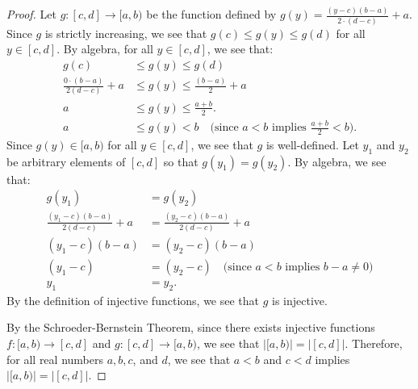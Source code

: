 \documentclass{amsart}
\newcommand{\abs}[1]{\left|#1\right|}
\numberwithin{equation}{section}
\begin{document}
\begin{problem}[manual-num=66]
\begin{proof}
			Let $g : [c, d] \rightarrow [a, b)$ be the function defined by $g(y) = \frac{(y - c)(b - a)}{2 \cdot (d - c)} + a$.
			Since $g$ is strictly increasing, we see that $g(c) \leq g(y) \leq g(d)$ for all $y \in [c, d]$.
			By algebra, for all $y \in [c, d]$, we see that:
			\begin{align*}
				g(c) &\leq g(y) \leq g(d) \\
				\frac{0 \cdot (b - a)}{2(d - c)} + a &\leq g(y) \leq \frac{(b - a)}{2} + a \\
				a &\leq g(y) \leq \frac{a + b}{2}. \\
				a &\leq g(y) < b \quad \text{(since $a < b$ implies $\frac{a + b}{2} < b$)}.
			\end{align*}
			Since $g(y) \in [a, b)$ for all $y \in [c, d]$, we see that $g$ is well-defined.
			Let $y_1$ and $y_2$ be arbitrary elements of $[c, d]$ so that $g(y_1) = g(y_2)$.
			By algebra, we see that:
			\begin{align*}
				g(y_1) &= g(y_2) \\
				\frac{(y_1 - c)(b - a)}{2(d - c)} + a &= \frac{(y_2 - c)(b - a)}{2(d - c)} + a \\
				(y_1 - c)(b - a) &= (y_2 - c)(b - a) \\
				(y_1 - c) &= (y_2 - c) \quad \text{(since $a < b$ implies $b - a \neq 0$)} \\
				y_1 &= y_2.
			\end{align*}
			By the definition of injective functions, we see that $g$ is injective.

			By the Schroeder-Bernstein Theorem, since there exists injective functions $f : [a, b) \rightarrow [c, d]$ and $g : [c, d] \rightarrow [a, b)$, we see that $\abs{[a, b)} = \abs{[c, d]}$.
			Therefore, for all real numbers $a, b, c$, and $d$, we see that $a < b$ and $c < d$ implies $\abs{[a, b)} = \abs{[c, d]}$.
		\end{proof}
	\end{problem}
\end{document}
